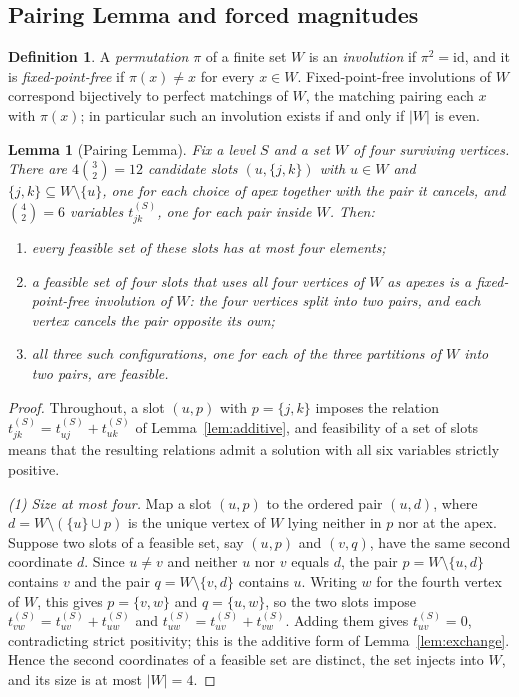 \documentclass[11pt]{article}
\theoremstyle{plain}
\newtheorem{lemma}[theorem]{Lemma}
\theoremstyle{definition}
\newtheorem{definition}[theorem]{Definition}
\theoremstyle{remark}
\begin{document}
\begin{aiblock}
\subsection{Pairing Lemma and forced magnitudes}

\begin{definition}\label{def:involution}
    A \emph{permutation} $\pi$ of a finite set $W$ is an \emph{involution} if $\pi^2=\mathrm{id}$, and it is \emph{fixed-point-free} if $\pi(x)\neq x$ for every $x\in W$. Fixed-point-free involutions of $W$ correspond bijectively to perfect matchings of $W$, the matching pairing each $x$ with $\pi(x)$; in particular such an involution exists if and only if $|W|$ is even.

\end{definition}

\begin{lemma}[Pairing Lemma]\label{lem:pairing}
Fix a level $S$ and a set $W$ of four surviving vertices. There are $4\binom{3}{2}=12$ candidate slots
$(u,\{j,k\})$ with $u\in W$ and $\{j,k\}\subseteq W\setminus\{u\}$, one for each choice of apex together
with the pair it cancels, and $\binom{4}{2}=6$ variables $t^{(S)}_{jk}$, one for each pair inside $W$.
Then:
\begin{enumerate}
\item every feasible set of these slots has at most four elements;
\item a feasible set of four slots that uses all four vertices of $W$ as apexes is a fixed-point-free
      involution of $W$: the four vertices split into two pairs, and each vertex cancels the pair
      opposite its own;
\item all three such configurations, one for each of the three partitions of $W$ into two pairs, are
      feasible.
\end{enumerate}
\end{lemma}
\begin{proof}
Throughout, a slot $(u,p)$ with $p=\{j,k\}$ imposes the relation
$t^{(S)}_{jk}=t^{(S)}_{uj}+t^{(S)}_{uk}$ of Lemma~\ref{lem:additive}, and feasibility of a set of slots
means that the resulting relations admit a solution with all six variables strictly positive.

\emph{(1) Size at most four.} Map a slot $(u,p)$ to the ordered pair $(u,d)$, where
$d=W\setminus(\{u\}\cup p)$ is the unique vertex of $W$ lying neither in $p$ nor at the apex. Suppose
two slots of a feasible set, say $(u,p)$ and $(v,q)$, have the same second coordinate $d$. Since
$u\neq v$ and neither $u$ nor $v$ equals $d$, the pair $p=W\setminus\{u,d\}$ contains $v$ and the pair
$q=W\setminus\{v,d\}$ contains $u$. Writing $w$ for the fourth vertex of $W$, this gives
$p=\{v,w\}$ and $q=\{u,w\}$, so the two slots impose $t^{(S)}_{vw}=t^{(S)}_{uv}+t^{(S)}_{uw}$ and
$t^{(S)}_{uw}=t^{(S)}_{uv}+t^{(S)}_{vw}$. Adding them gives $t^{(S)}_{uv}=0$, contradicting strict
positivity; this is the additive form of Lemma~\ref{lem:exchange}. Hence the second coordinates of a
feasible set are distinct, the set injects into $W$, and its size is at most $|W|=4$.


\end{proof}
\end{aiblock}
\end{document}
